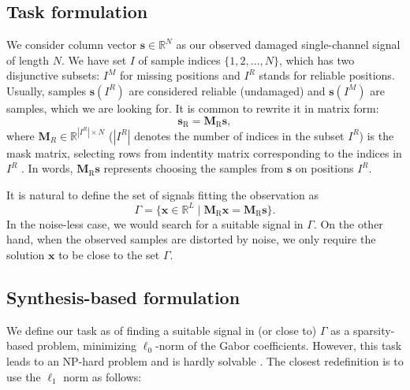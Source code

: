 \documentclass[conference]{IEEEtran}
\newcommand{\todo}[1]{\textcolor{red}{#1}}
\begin{document}
\subsection{Task formulation}

We consider column vector $ \mathbf{s} \in \mathbb{R}^{N} $ as our observed damaged single-channel signal of length $ N $.
We have set $ I $ of sample indices $ \{1,2,\dots,N\} $, which has two disjunctive subsets: $ I^M $ for missing positions and $ I^R $ stands for reliable positions.
Usually, samples $ \mathbf{s}(I^R) $ are considered reliable (undamaged) and $ \mathbf{s}(I^M) $ are samples, which we are looking for.
It is common to rewrite it in matrix form:
\begin{equation*}
	\mathbf{s}_{\mathrm{R}} = \mathbf{M}_{\mathrm{R}}\mathbf{s},
\end{equation*}
where $\mathbf{M}_{R} \in \mathbb{R} ^ { |I^R| \times N}$ ($ |I^R|$ denotes the number of indices in the subset $I^R$) is the mask matrix, selecting rows from indentity matrix corresponding to the indices in $I^R$ \cite{Adler2012}.
In words, $\mathbf{M}_{\mathrm{R}}\mathbf{s}$ represents choosing the samples from $\mathbf{s}$ on positions $I^R$.

It is natural to define the set of signals fitting the observation as
\begin{equation}
	\label{eq:Gamma}
	\Gamma = \lbrace \mathbf{x}\in \mathbb {R}^L\mid \mathbf{M}_{\mathrm{R}}\mathbf{x}=\mathbf{M}_{\mathrm{R}}\mathbf {s}\rbrace.
\end{equation}
In the noise-less case, we would search for a suitable signal in $\Gamma$.
On the other hand, when the observed samples are distorted by noise, we only require the solution $\mathbf{x}$ to be close to the set $\Gamma$.

\subsection{Synthesis-based formulation}\label{subsec:freqcoef}

We define our task as of finding a suitable signal in (or close to) $\Gamma$ as a sparsity-based problem, minimizing $ \ell_0 $-norm of the Gabor coefficients.
However, this task leads to an NP-hard problem and is hardly solvable \cite{Mokry2020}.
The closest redefinition is to use the $ \ell_1 $ norm as follows:
\end{document}
